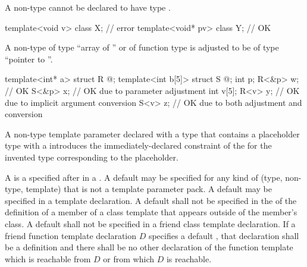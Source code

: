 \pnum
\begin{note}
A non-type
cannot be declared to have type \cv{} .
\begin{example}
\begin{codeblock}
template<void v> class X;       // error
template<void* pv> class Y;     // OK
\end{codeblock}
\end{example}
\end{note}

\pnum
A non-type
%
of type ``array of '' or
%
of function type 
is adjusted to be of type ``pointer to ''.
\begin{example}
\begin{codeblock}
template<int* a>   struct R { @\commentellip@ };
template<int b[5]> struct S { @\commentellip@ };
int p;
R<&p> w;                        // OK
S<&p> x;                        // OK due to parameter adjustment
int v[5];
R<v> y;                         // OK due to implicit argument conversion
S<v> z;                         // OK due to both adjustment and conversion
\end{codeblock}
\end{example}

\pnum
A non-type template parameter declared with a type that
contains a placeholder type with a 
introduces the immediately-declared constraint
of the 
for the invented type corresponding to the placeholder.

\pnum
A
is a
 specified after
\tcode{=}
in a
.
A default
may be specified for any kind of
(type, non-type, template)
that is not a template parameter pack.
A default
may be specified in a template declaration.
A default
shall not be specified in the
of the definition of a member of a class template that appears outside
of the member's class.
A default
shall not be specified in a friend class template declaration.
If a friend function template declaration $D$
specifies a default ,
that declaration shall be a definition and
there shall be no other declaration of the function template
which is reachable from $D$ or from which $D$ is reachable.


